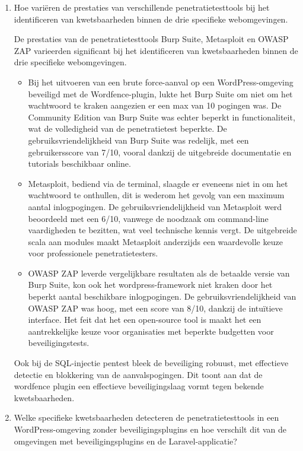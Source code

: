 \begin{enumerate}
  \item 	Hoe variëren de prestaties van verschillende penetratietesttools bij het identificeren van kwetsbaarheden binnen de drie specifieke webomgevingen.
  
  De prestaties van de penetratietesttools Burp Suite, Metasploit en OWASP ZAP varieerden significant bij het identificeren 
  van kwetsbaarheden binnen de drie specifieke webomgevingen.
  \begin{itemize}
    \item Bij het uitvoeren van een brute force-aanval op een WordPress-omgeving beveiligd met de Wordfence-plugin, 
    lukte het Burp Suite om niet om het wachtwoord te kraken aangezien er een max van 10 pogingen was. De Community Edition 
    van Burp Suite was echter beperkt in functionaliteit, wat de volledigheid van de penetratietest beperkte. De 
    gebruiksvriendelijkheid van Burp Suite was redelijk, met een gebruikersscore van 7/10, vooral dankzij de uitgebreide 
    documentatie en tutorials beschikbaar online.
    \item Metasploit, bediend via de terminal, slaagde er eveneens niet in om het wachtwoord te onthullen, dit is wederom het 
    gevolg van een maximum aantal inlogpogingen. De gebruiksvriendelijkheid van Metasploit werd beoordeeld 
    met een 6/10, vanwege de noodzaak om command-line vaardigheden te bezitten, wat veel technische kennis vergt. 
    De uitgebreide scala aan modules maakt Metasploit anderzijds een waardevolle keuze voor professionele penetratietesters.
    \item OWASP ZAP leverde vergelijkbare resultaten als de betaalde versie van Burp Suite, kon ook het wordpress-framework 
    niet kraken door het beperkt aantal beschikbare inlogpogingen. De gebruiksvriendelijkheid van OWASP ZAP was hoog, met een score van 8/10, 
    dankzij de intuïtieve interface. Het feit dat het een open-source tool is maakt het een aantrekkelijke keuze voor 
    organisaties met beperkte budgetten voor beveiligingstests.
  \end{itemize}
  Ook bij de SQL-injectie pentest bleek de beveiliging robuust, met effectieve detectie en blokkering van de aanvalspogingen.
  Dit toont aan dat de wordfence plugin een effectieve beveiligingslaag vormt tegen bekende kwetsbaarheden.
  
  \item Welke specifieke kwetsbaarheden detecteren de penetratietesttools in een WordPress-omgeving zonder beveiligingsplugins en hoe verschilt dit van de omgevingen met beveiligingsplugins en de Laravel-applicatie?
  

\end{enumerate}
